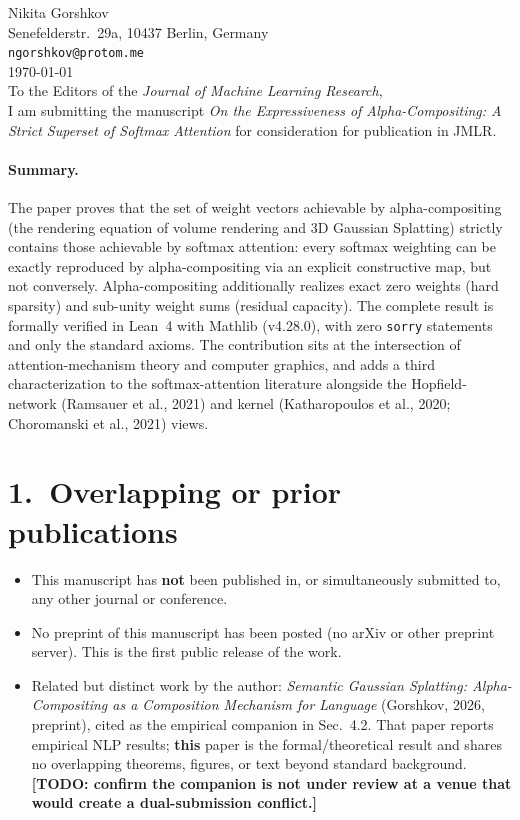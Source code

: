 \documentclass[11pt]{article}
\begin{document}
\thispagestyle{empty}

\noindent Nikita Gorshkov\\
Senefelderstr.\ 29a, 10437 Berlin, Germany\\
\texttt{ngorshkov@protom.me}\\[1em]
\noindent\today\\[1em]

\noindent To the Editors of the \emph{Journal of Machine Learning Research},\\

I am submitting the manuscript \emph{On the Expressiveness of Alpha-Compositing:
A Strict Superset of Softmax Attention} for consideration for publication in JMLR.

\paragraph{Summary.}
The paper proves that the set of weight vectors achievable by alpha-compositing
(the rendering equation of volume rendering and 3D Gaussian Splatting) strictly
contains those achievable by softmax attention: every softmax weighting can be
exactly reproduced by alpha-compositing via an explicit constructive map, but not
conversely. Alpha-compositing additionally realizes exact zero weights (hard
sparsity) and sub-unity weight sums (residual capacity). The complete result is
formally verified in Lean~4 with Mathlib (v4.28.0), with zero \texttt{sorry}
statements and only the standard axioms. The contribution sits at the
intersection of attention-mechanism theory and computer graphics, and adds a
third characterization to the softmax-attention literature alongside the
Hopfield-network (Ramsauer et al., 2021) and kernel (Katharopoulos et al., 2020;
Choromanski et al., 2021) views.

\section*{1.~Overlapping or prior publications}
\begin{itemize}[leftmargin=1.4em]
  \item This manuscript has \textbf{not} been published in, or simultaneously
    submitted to, any other journal or conference.
  \item No preprint of this manuscript has been posted (no arXiv or other
    preprint server). This is the first public release of the work.
  \item Related but distinct work by the author: \emph{Semantic Gaussian
    Splatting: Alpha-Compositing as a Composition Mechanism for Language}
    (Gorshkov, 2026, preprint), cited as the empirical companion in Sec.~4.2.
    That paper reports empirical NLP results; \textbf{this} paper is the
    formal/theoretical result and shares no overlapping theorems, figures, or
    text beyond standard background. \textbf{[TODO: confirm the companion is not
    under review at a venue that would create a dual-submission conflict.]}
\end{itemize}
\end{document}

